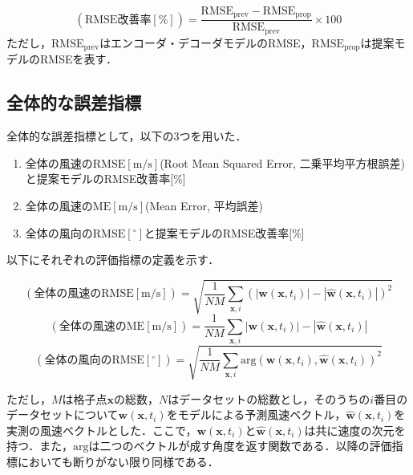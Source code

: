 \begin{equation}
  (\mathrm{RMSE改善率 [\%]}) = \frac{\mathrm{RMSE_{prev}} - \mathrm{RMSE_{prop}}}{\mathrm{RMSE_{prev}}} \times 100
  \label{eq:exp-rmse-improvement-rate}
\end{equation}
ただし，$\mathrm{RMSE_{prev}}$はエンコーダ・デコーダモデルのRMSE，$\mathrm{RMSE_{prop}}$は提案モデルのRMSEを表す．

\subsection{全体的な誤差指標 \label{subsection:exp-metrics-total}}
全体的な誤差指標として，以下の3つを用いた．

\begin{enumerate}
  \item 全体の風速の$\mathrm{RMSE[m/s]}$(Root Mean Squared Error, 二乗平均平方根誤差)と提案モデルのRMSE改善率[\%]
  \item 全体の風速の$\mathrm{ME[m/s]}$(Mean Error, 平均誤差)
  \item 全体の風向の$\mathrm{RMSE[^\circ]}$と提案モデルのRMSE改善率[\%]
\end{enumerate}

以下にそれぞれの評価指標の定義を示す．

\begin{equation}
  (\mathrm{全体の風速のRMSE [m/s]}) = \sqrt{\frac{1}{NM} \sum_{\bm{x}, i} (|\bm{w}(\bm{x}, t_i)| - |\hat{\bm{w}}(\bm{x}, t_i)|)^2}
  \label{eq:exp-rmse}
\end{equation}
\begin{equation}
  (\mathrm{全体の風速のME [m/s]}) = \frac{1}{NM} \sum_{\bm{x}, i} |\bm{w}(\bm{x}, t_i)| - |\hat{\bm{w}}(\bm{x}, t_i)|
  \label{eq:exp-me}
\end{equation}
\begin{equation}
  (\mathrm{全体の風向のRMSE [^\circ]}) = \sqrt{\frac{1}{NM} \sum_{\bm{x}, i} \mathrm{arg}(\bm{w}(\bm{x}, t_i), \hat{\bm{w}}(\bm{x}, t_i))^2}
  \label{eq:exp-rmse-direction}
\end{equation}

ただし，$M$は格子点$\bm{x}$の総数，$N$はデータセットの総数とし，そのうちの$i$番目のデータセットについて$\bm{w}(\bm{x}, t_i)$をモデルによる予測風速ベクトル，$\hat{\bm{w}}(\bm{x}, t_i)$を実測の風速ベクトルとした．ここで，$\bm{w}(\bm{x}, t_i)$と$\hat{\bm{w}}(\bm{x}, t_i)$は共に速度の次元を持つ．また，$\mathrm{arg}$は二つのベクトルが成す角度を返す関数である．以降の評価指標においても断りがない限り同様である．

